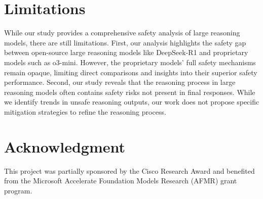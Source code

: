 \section*{Limitations}
While our study provides a comprehensive safety analysis of large reasoning models, there are still limitations.
First, our analysis highlights the safety gap between open-source large reasoning models like DeepSeek-R1 and proprietary models such as o3-mini. However, the proprietary models' full safety mechanisms remain opaque, limiting direct comparisons and insights into their superior safety performance. 
Second, our study reveals that the reasoning process in large reasoning models often contains safety risks not present in final responses. While we identify trends in unsafe reasoning outputs, our work does not propose specific mitigation strategies to refine the reasoning process.

\section*{Acknowledgment}
This project was partially sponsored by the Cisco Research Award and benefited from the Microsoft Accelerate Foundation Models Research (AFMR) grant program.